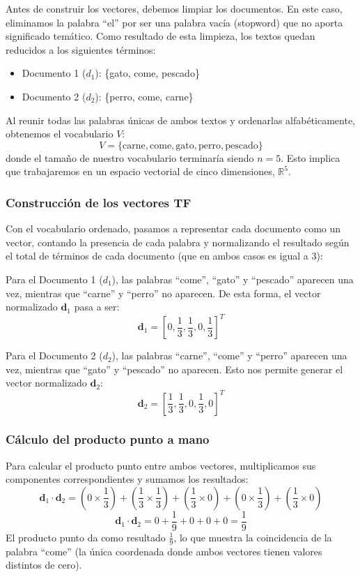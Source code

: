 \documentclass[12pt,a4paper]{article}
\begin{document}
Antes de construir los vectores, debemos limpiar los documentos. En este caso, eliminamos la palabra ``el'' por ser una palabra vacía (stopword) que no aporta significado temático. Como resultado de esta limpieza, los textos quedan reducidos a los siguientes términos:
\begin{itemize}
    \item Documento 1 ($d_1$): \{gato, come, pescado\}
    \item Documento 2 ($d_2$): \{perro, come, carne\}
\end{itemize}

Al reunir todas las palabras únicas de ambos textos y ordenarlas alfabéticamente, obtenemos el vocabulario $V$:
\[
V = \{\text{carne}, \text{come}, \text{gato}, \text{perro}, \text{pescado}\}
\]
donde el tamaño de nuestro vocabulario terminaría siendo $n = 5$. Esto implica que trabajaremos en un espacio vectorial de cinco dimensiones, $\mathbb{R}^5$.

\subsubsection{Construcción de los vectores TF}

Con el vocabulario ordenado, pasamos a representar cada documento como un vector, contando la presencia de cada palabra y normalizando el resultado según el total de términos de cada documento (que en ambos casos es igual a 3):

Para el Documento 1 ($d_1$), las palabras ``come'', ``gato'' y ``pescado'' aparecen una vez, mientras que ``carne'' y ``perro'' no aparecen. De esta forma, el vector normalizado $\mathbf{d}_1$ pasa a ser:
\[
\mathbf{d}_1 = \left[ 0, \frac{1}{3}, \frac{1}{3}, 0, \frac{1}{3} \right]^T
\]

Para el Documento 2 ($d_2$), las palabras ``carne'', ``come'' y ``perro'' aparecen una vez, mientras que ``gato'' y ``pescado'' no aparecen. Esto nos permite generar el vector normalizado $\mathbf{d}_2$:
\[
\mathbf{d}_2 = \left[ \frac{1}{3}, \frac{1}{3}, 0, \frac{1}{3}, 0 \right]^T
\]

\subsubsection{Cálculo del producto punto a mano}

Para calcular el producto punto entre ambos vectores, multiplicamos sus componentes correspondientes y sumamos los resultados:
\[
\mathbf{d}_1 \cdot \mathbf{d}_2 = \left(0 \times \frac{1}{3}\right) + \left(\frac{1}{3} \times \frac{1}{3}\right) + \left(\frac{1}{3} \times 0\right) + \left(0 \times \frac{1}{3}\right) + \left(\frac{1}{3} \times 0\right)
\]
\[
\mathbf{d}_1 \cdot \mathbf{d}_2 = 0 + \frac{1}{9} + 0 + 0 + 0 = \frac{1}{9}
\]
El producto punto da como resultado $\frac{1}{9}$, lo que muestra la coincidencia de la palabra ``come'' (la única coordenada donde ambos vectores tienen valores distintos de cero).
\end{document}
